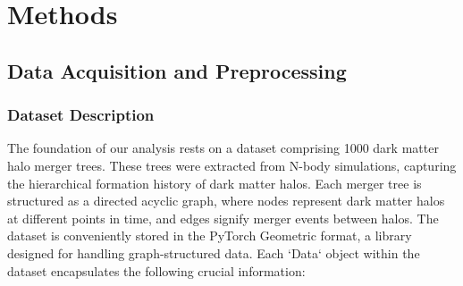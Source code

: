 \documentclass[twocolumn]{aastex631}
\begin{document}
\section{Methods}
\label{sec:methods}
\subsection{Data Acquisition and Preprocessing}

\subsubsection{Dataset Description}
The foundation of our analysis rests on a dataset comprising 1000 dark matter halo merger trees. These trees were extracted from N-body simulations, capturing the hierarchical formation history of dark matter halos. Each merger tree is structured as a directed acyclic graph, where nodes represent dark matter halos at different points in time, and edges signify merger events between halos. The dataset is conveniently stored in the PyTorch Geometric format, a library designed for handling graph-structured data. Each `Data` object within the dataset encapsulates the following crucial information:
\end{document}
